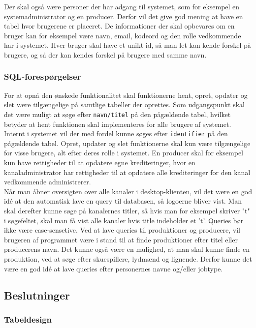 Der skal også være personer der har adgang til systemet, som for eksempel en systemadministrator og en producer. Derfor vil det give god mening at have en tabel hvor brugerene er placeret. De informationer der skal opbevares om en bruger kan for eksempel være navn, email, kodeord og den rolle vedkommende har i systemet. Hver bruger skal have et unikt id, så man let kan kende forskel på brugere, og så der kan kendes forskel på brugere med samme navn.

\subsubsection{SQL-forespørgelser}
For at opnå den ønskede funktionalitet skal funktionerne hent, opret, opdater og slet være tilgængelige på samtlige tabeller der oprettes. Som udgangspunkt skal det være muligt at søge efter \texttt{navn/titel} på den pågældende tabel, hvilket betyder at hent funktionen skal implementeres for alle brugere af systemet. Internt i systemet vil der med fordel kunne søges efter \texttt{identifier} på den pågældende tabel. Opret, updater og slet funktionerne skal kun være tilgængelige for visse brugere, alt efter deres rolle i systemet. En producer skal for eksempel kun have rettigheder til at opdatere egne krediteringer, hvor en kanaladministrator har rettigheder til at opdatere alle krediteringer for den kanal vedkommende administrerer. \\


Når man åbner oversigten over alle kanaler i desktop-klienten, vil det være en god idé at den automatisk lave en query til databasen, så logoerne bliver vist. Man skal derefter kunne søge på kanalernes titler, så hvis man for eksempel skriver "t" i søgefeltet, skal man få vist alle kanaler hvis title indeholder et 't'. Queries bør ikke være case-sensetive. Ved at lave queries til produktioner og producere, vil brugeren af programmet være i stand til at finde produktioner efter titel eller producerens navn. Det kunne også være en mulighed, at man skal kunne finde en produktion, ved at søge efter skuespillere, lydmænd og lignende. Derfor kunne det være en god idé at lave queries efter personernes navne og/eller jobtype.

\subsection{Beslutninger}
\subsubsection{Tabeldesign}

